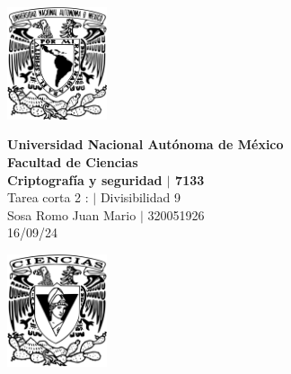 \begin{center}
    \begin{minipage}{3cm}
    	\begin{center}
    		\includegraphics[height=3.3cm]{src/Img/Logo_UNAM.png}
    	\end{center}
    \end{minipage}\hfill
    \begin{minipage}{10cm}
    	\begin{center}
    	\textbf{\large Universidad Nacional Autónoma de México}\\[0.1cm]
        \textbf{Facultad de Ciencias}\\[0.1cm]
        \textbf{Criptografía y seguridad $|$ 7133}\\[0.1cm]
        Tarea corta 2 : $|$ Divisibilidad 9 \\[0.1cm]
        Sosa Romo Juan Mario $|$ 320051926 \\[0.1cm]
        16/09/24
    	\end{center}
    \end{minipage}\hfill
    \begin{minipage}{3cm}
    	\begin{center}
    		\includegraphics[height=3.3cm]{src/Img/Logo_FC.png}
    	\end{center}
    \end{minipage}
\end{center}

